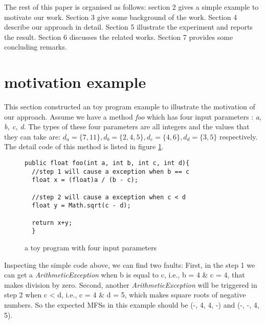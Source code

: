 \documentclass{sig-alternate}
\begin{document}


The rest of this paper is organised as follows:
section 2 gives a simple example to motivate our work. Section 3 give some background of the work. Section 4 describe our approach in detail. Section 5 illustrate the experiment and reports the result. Section 6 discusses the related works. Section 7 provides some concluding remarks.

\section{motivation example}

This section constructed an toy program example to illustrate the motivation of our approach. Assume we have a method \emph{foo} which has four input parameters : \emph{a, b, c, d}. The types of these four parameters are all integers and the values that they can take are: $d_{a} = \{7, 11\}, d_{b} = \{2, 4, 5\}, d_{c} = \{4, 6\}, d_{d} = \{3, 5\}$ respectively.  The detail code of this method is listed in figure \ref{toy-program}.
\begin{figure}
\begin{verbatim}
public float foo(int a, int b, int c, int d){
  //step 1 will cause a exception when b == c
  float x = (float)a / (b - c);

  //step 2 will cause a exception when c < d
  float y = Math.sqrt(c - d);

  return x+y;
  }
\end{verbatim}
\caption{a toy program with four input parameters}
\label{toy-program}
\end{figure}

Inspecting the simple code above, we can find two faults: First, in the step 1 we can get a \emph{ArithmeticException} when b is equal to c, i.e.,  b = 4 \& c = 4, that makes division by zero. Second, another \emph{ArithmeticException} will be triggered in step 2 when c < d, i.e., c = 4 \& d = 5, which makes square roots of negative numbers. So the expected MFSs in this example should be (-, 4, 4, -) and (-, -, 4, 5).
\end{document}
